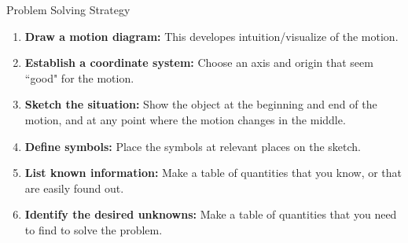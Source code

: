 \documentclass{beamer}
\begin{document}
\begin{frame}{Problem Solving Strategy}
\begin{enumerate}
   \item {\bf Draw a motion diagram:} This developes intuition/visualize of the motion.
   \item {\bf Establish a coordinate system:} Choose an axis and origin that seem ``good" for the motion.
   \item {\bf Sketch the situation:} Show the object at the beginning and end of the motion, and at any point where the motion changes in the middle.
   \item {\bf Define symbols:} Place the symbols at relevant places on the sketch.
   \item {\bf List known information:} Make a table of quantities that you know, or that are easily found out.
   \item {\bf Identify the desired unknowns:} Make a table of quantities that you need to find to solve the problem.
\end{enumerate}
\end{frame}
\end{document}
